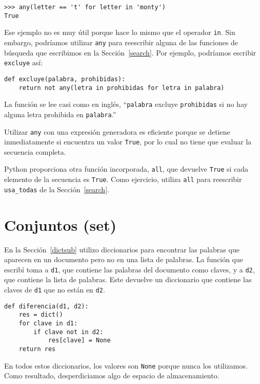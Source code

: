\documentclass[10pt]{book}
\begin{document}
\begin{verbatim}
>>> any(letter == 't' for letter in 'monty')
True
\end{verbatim}
%
Ese ejemplo no es muy útil porque hace lo mismo que
el operador {\tt in}.  Sin embargo, podríamos utilizar {\tt any} para reescribir
alguna de las funciones de búsqueda que escribimos en la Sección~\ref{search}.  Por
ejemplo, podríamos escribir {\tt excluye} así:

\begin{verbatim}
def excluye(palabra, prohibidas):
    return not any(letra in prohibidas for letra in palabra)
\end{verbatim}
%
La función se lee casi como en inglés, ``{\tt palabra} excluye
{\tt prohibidas} si no hay alguna letra prohibida en {\tt palabra}.''

Utilizar {\tt any} con una expresión generadora es eficiente porque
se detiene inmediatamente si encuentra un valor {\tt True},
por lo cual no tiene que evaluar la secuencia completa.

Python proporciona otra función incorporada, {\tt all}, que devuelve
{\tt True} si cada elemento de la secuencia es {\tt True}.  Como
ejercicio, utiliza {\tt all} para reescribir \verb"usa_todas" de la
Sección~\ref{search}.


\section{Conjuntos (set)}
\label{sets}

En la Sección~\ref{dictsub} utilizo diccionarios para encontrar las palabras
que aparecen en un documento pero no en una lista de palabras.  La función
que escribí toma a {\tt d1}, que contiene las palabras del documento
como claves, y a {\tt d2}, que contiene la lista de palabras.  Este
devuelve un diccionario que contiene las claves de {\tt d1} que
no están en {\tt d2}.

\begin{verbatim}
def diferencia(d1, d2):
    res = dict()
    for clave in d1:
        if clave not in d2:
            res[clave] = None
    return res
\end{verbatim}
%
En todos estos diccionarios, los valores son {\tt None} porque
nunca los utilizamos.  Como resultado, desperdiciamos algo de espacio de almacenamiento.
\end{document}
